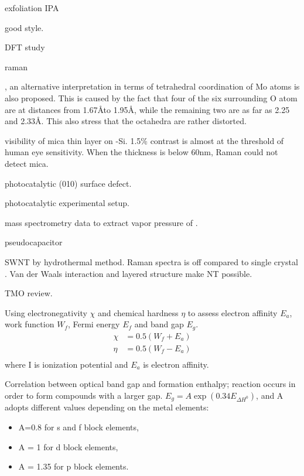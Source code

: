 exfoliation IPA \cite{Halim2013}  \cite{Zhou2011a}

 good style. \cite{Siciliano2009} \cite{Abdellaoui1997}

  DFT study \cite{B511044K} \cite{Cora1997} \cite{Sayede2005}

 raman \cite{Lee2002}


, an alternative interpretation in terms of tetrahedral coordination of Mo atoms is also proposed. This is caused by the fact that four of the six surrounding O atom are at distances from 1.67\AA to 1.95\AA, while the remaining two are as far as 2.25 and 2.33\AA. This also stress that the  octahedra are rather distorted.

visibility of mica thin layer on -Si. \cite{Castellanos-gomez2011} 1.5\% contrast is almost at the threshold of human eye sensitivity.  When the thickness is below 60nm, Raman could not detect mica.

 photocatalytic \cite{Chithambararaj2013}
 (010) surface defect. \cite{Chen2001}

photocatalytic experimental setup.\cite{Hupka2006}

mass spectrometry data to extract vapor pressure of .

 pseudocapacitor  \cite{Brezesinski2010}

 SWNT by hydrothermal method.\cite{Hu2008a} Raman spectra is off compared to single crystal .  Van der Waals interaction and layered structure make NT possible.

TMO review.\cite{Goodenough2013}

\cite{Matar2011} Using electronegativity $\chi$ and chemical hardness $\eta$ to assess electron affinity $E_a$, work function $W_f$, Fermi energy $E_f$ and band gap $E_g$.
\begin{align}
\chi &= 0.5(W_f + E_a)\\
\eta & = 0.5(W_f - E_a)\\
\end{align}
where I is ionization potential and $E_a$ is electron affinity.

Correlation between optical band gap and formation enthalpy; reaction occurs in order to form compounds with a larger gap.  $E_g = A \exp(0.34E_{\Delta H^0})$, and A adopts different values depending on the metal elements:
\begin{itemize}
\item A=0.8 for s and f block elements,
\item A = 1 for d block elements,
\item A = 1.35 for p block elements.
\end{itemize}

